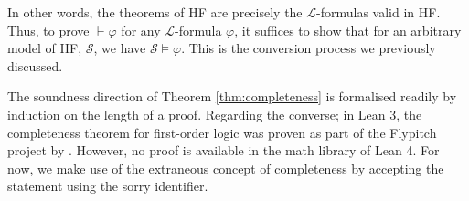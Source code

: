 In other words, the theorems of HF are precisely the $\mathcal{L}$-formulas valid in HF.
Thus, to prove $\vdash \varphi$ for any $\mathcal{L}$-formula $\varphi$, it suffices to show that for an 
arbitrary model of HF, $\mathcal{S}$, we have $\mathcal{S} \vDash \varphi$.
This is the conversion process we previously discussed.

The soundness direction of Theorem \ref{thm:completeness} is formalised readily
by induction on the length of a proof.
Regarding the converse; in Lean 3, the completeness theorem for first-order logic was proven 
as part of the Flypitch project by \cite{han2020formal}.
However, no proof is available in the math library of Lean 4.
For now, we make use of the extraneous concept of completeness 
by accepting the statement using the {\ttfamily \small sorry} identifier. 